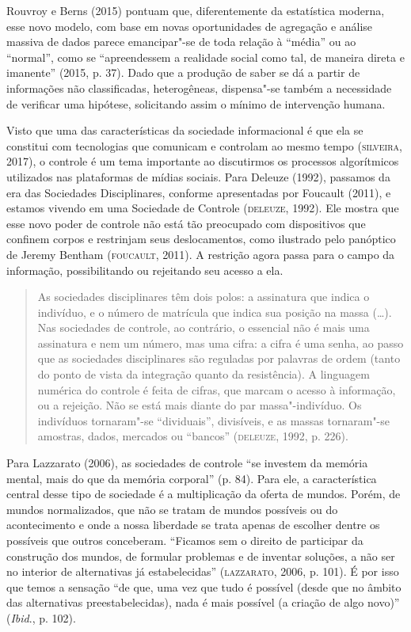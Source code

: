 Rouvroy e Berns (2015) pontuam que, diferentemente da estatística
moderna, esse novo modelo, com base em novas oportunidades de agregação
e análise massiva de dados parece emancipar"-se de toda relação à
``média'' ou ao ``normal'', como se ``apreendessem a realidade social
como tal, de maneira direta e imanente'' (2015, p. 37). Dado que a produção
de saber se dá a partir de informações não classificadas, heterogêneas,
dispensa"-se também a necessidade de verificar uma hipótese, solicitando
assim o mínimo de intervenção humana.

Visto que uma das características da sociedade informacional é que ela
se constitui com tecnologias que comunicam e controlam ao mesmo tempo
(\textsc{silveira}, 2017), o controle é um tema importante ao discutirmos os
processos algorítmicos utilizados nas plataformas de mídias sociais.
Para Deleuze (1992), passamos da era das Sociedades Disciplinares,
conforme apresentadas por Foucault (2011), e estamos vivendo em uma Sociedade de Controle (\textsc{deleuze}, 1992). Ele mostra que esse novo poder de controle não está tão
preocupado com dispositivos que confinem corpos e restrinjam seus
deslocamentos, como ilustrado pelo panóptico de Jeremy Bentham (\textsc{foucault}, 2011).
A restrição agora passa para o campo da informação, possibilitando ou rejeitando seu acesso a ela.

\begin{quote}
As sociedades disciplinares têm dois polos: a assinatura que indica o
indivíduo, e o número de matrícula que indica sua posição na massa
(\ldots{}). Nas sociedades de controle, ao contrário, o essencial não é mais
uma assinatura e nem um número, mas uma cifra: a cifra é uma senha, ao
passo que as sociedades disciplinares são reguladas por palavras de
ordem (tanto do ponto de vista da integração quanto da resistência). A
linguagem numérica do controle é feita de cifras, que marcam o acesso à
informação, ou a rejeição. Não se está mais diante do par
massa"-indivíduo. Os indivíduos tornaram"-se ``dividuais'', divisíveis, e
as massas tornaram"-se amostras, dados, mercados ou ``bancos'' (\textsc{deleuze},
1992, p. 226).
\end{quote}

Para Lazzarato (2006), as sociedades de controle ``se investem da memória mental, mais do que
da memória corporal'' (p. 84). Para ele, a característica central desse
tipo de sociedade é a multiplicação da oferta de mundos. Porém, de
mundos normalizados, que não se tratam de mundos possíveis ou do
acontecimento e onde a nossa liberdade se trata apenas de escolher
dentre os possíveis que outros conceberam. ``Ficamos sem o direito de
participar da construção dos mundos, de formular problemas e de inventar
soluções, a não ser no interior de alternativas já estabelecidas''
(\textsc{lazzarato}, 2006, p. 101).
É por isso que temos a sensação ``de que, uma vez que tudo é possível
(desde que no âmbito das alternativas preestabelecidas), nada é mais
possível (a criação de algo novo)'' (\emph{Ibid}., p. 102).

